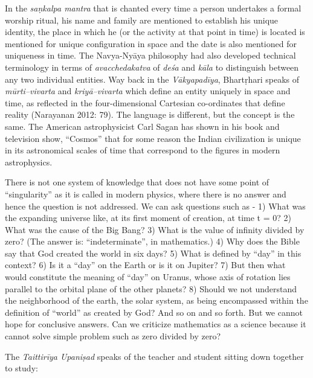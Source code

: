 In the \textit{saṇkalpa mantra} that is chanted every time a person undertakes a formal worship ritual, his name and family are mentioned to establish his unique identity, the place in which he (or the activity at that point in time) is located is mentioned for unique configuration in space and the date is also mentioned for uniqueness in time. The Navya-Nyāya philosophy had also developed technical terminology in terms of \textit{avacchedakatva} of \textit{deśa} and \textit{kāla} to distinguish between any two individual entities. Way back in the \textit{Vākyapadīya}, Bhartṛhari speaks of \textit{mūrti--vivarta} and \textit{kriyā--vivarta} which define an entity uniquely in space and time, as reflected in the four-dimensional Cartesian co-ordinates that define reality (Narayanan 2012: 79). The language is different, but the concept is the same. The American astrophysicist Carl Sagan has shown in his book and television show, “Cosmos” that for some reason the Indian civilization is unique in its astronomical scales of time that correspond to the figures in modern astrophysics.

There is not one system of knowledge that does not have some point of “singularity” as it is called in modern physics, where there is no answer and hence the question is not addressed. We can ask questions such as - 1) What was the expanding universe like, at its first moment of creation, at time t = 0? 2) What was the cause of the Big Bang? 3) What is the value of infinity divided by zero? (The answer is: “indeterminate”, in mathematics.) 4) Why does the Bible say that God created the world in six days? 5) What is defined by “day” in this context? 6) Is it a “day” on the Earth or is it on Jupiter? 7) But then what would constitute the meaning of “day” on Uranus, whose axis of rotation lies parallel to the orbital plane of the other planets? 8) Should we not understand the neighborhood of the earth, the solar system, as being encompassed within the definition of “world” as created by God? And so on and so forth. But we cannot hope for conclusive answers. Can we criticize mathematics as a science because it cannot solve simple problem such as zero divided by zero?

The \textit{Taittirīya Upaniṣad} speaks of the teacher and student sitting down together to study: 

